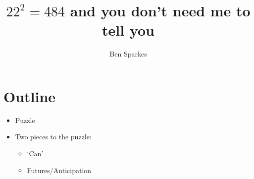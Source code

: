 \documentclass[10pt]{article}
\title{\(22^{2} = 484\) and you don't need me to tell you}
\author{Ben Sparkes}
\begin{document}
\maketitle

\tableofcontents

\newpage

\section*{Outline}
\label{sec:outline}

\begin{itemize}
\item Puzzle
\item Two pieces to the puzzle:
  \begin{itemize}
  \item `Can'
  \item Futures/Anticipation
  \end{itemize}
\end{itemize}
\end{document}
